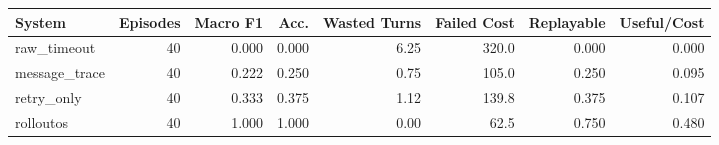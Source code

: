 \begin{tabular}{lrrrrrrr}
\toprule
System & Episodes & Macro F1 & Acc. & Wasted Turns & Failed Cost & Replayable & Useful/Cost \\
\midrule
raw\_timeout & 40 & 0.000 & 0.000 & 6.25 & 320.0 & 0.000 & 0.000 \\
message\_trace & 40 & 0.222 & 0.250 & 0.75 & 105.0 & 0.250 & 0.095 \\
retry\_only & 40 & 0.333 & 0.375 & 1.12 & 139.8 & 0.375 & 0.107 \\
rolloutos & 40 & 1.000 & 1.000 & 0.00 & 62.5 & 0.750 & 0.480 \\
\bottomrule
\end{tabular}
